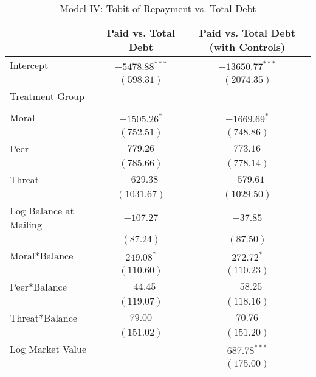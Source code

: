 \documentclass[12pt,titlepage]{article}
\begin{document}
\begin{table}
\begin{center}
\caption{Model IV: Tobit of Repayment vs. Total Debt}
\label{table:modelIV}
\begin{tabular}{l c c }
\hline
                       & Paid vs. Total Debt & Paid vs. Total Debt (with Controls) \\
\hline
Intercept              & $-5478.88^{***}$ & $-13650.77^{***}$ \\
                       & $(598.31)$       & $(2074.35)$       \\
Treatment Group        &                  &                   \\
                       &                  &                   \\
\quad Moral            & $-1505.26^{*}$   & $-1669.69^{*}$    \\
                       & $(752.51)$       & $(748.86)$        \\
\quad Peer             & $779.26$         & $773.16$          \\
                       & $(785.66)$       & $(778.14)$        \\
\quad Threat           & $-629.38$        & $-579.61$         \\
                       & $(1031.67)$      & $(1029.50)$       \\
Log Balance at Mailing & $-107.27$        & $-37.85$          \\
                       & $(87.24)$        & $(87.50)$         \\
Moral*Balance          & $249.08^{*}$     & $272.72^{*}$      \\
                       & $(110.60)$       & $(110.23)$        \\
Peer*Balance           & $-44.45$         & $-58.25$          \\
                       & $(119.07)$       & $(118.16)$        \\
Threat*Balance         & $79.00$          & $70.76$           \\
                       & $(151.02)$       & $(151.20)$        \\
Log Market Value       &                  & $687.78^{***}$    \\
                       &                  & $(175.00)$        \\
\hline

\end{tabular}
\end{center}
\end{table}
\end{document}
